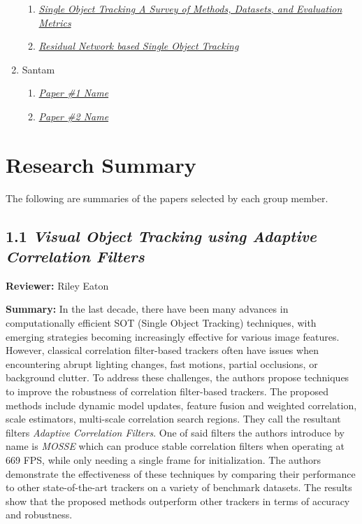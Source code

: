 \documentclass{article}
\begin{document}
\begin{enumerate}
\begin{enumerate}[label*=\arabic*.]
  \item \textit{\href{https://arxiv.org/abs/2201.13066}{Single Object Tracking\: A Survey of Methods, Datasets, and Evaluation Metrics}}
  \item \textit{\href{https://ieeexplore.ieee.org/document/9774086}{Residual Network based Single Object Tracking}}
  \end{enumerate}
\item Santam
  \begin{enumerate}[label*=\arabic*.]
  \item \textit{\href{paper_link_here}{Paper \#1 Name}}
  \item \textit{\href{paper_link_here}{Paper \#2 Name}}
  \end{enumerate}
\end{enumerate}

\section*{Research Summary}

The following are summaries of the papers selected by each group member.

\subsection*{1.1 \textit{Visual Object Tracking using Adaptive Correlation Filters}}

\hspace*{\parindent}\textbf{Reviewer:} Riley Eaton

\vspace{0.3cm}

\textbf{Summary:} In the last decade, there have been many advances in computationally efficient SOT (Single Object Tracking) techniques, with emerging strategies becoming increasingly effective for various image features. However, classical correlation filter-based trackers often have issues when encountering abrupt lighting changes, fast motions, partial occlusions, or background clutter. To address these challenges, the authors propose techniques to improve the robustness of correlation filter-based trackers. The proposed methods include dynamic model updates, feature fusion and weighted correlation, scale estimators, multi-scale correlation search regions. They call the resultant filters \emph{Adaptive Correlation Filters}. One of said filters the authors introduce by name is \emph{MOSSE} which can produce stable correlation filters when operating at 669 FPS, while only needing a single frame for initialization. The authors demonstrate the effectiveness of these techniques by comparing their performance to other state-of-the-art trackers on a variety of benchmark datasets. The results show that the proposed methods outperform other trackers in terms of accuracy and robustness.
\end{document}
